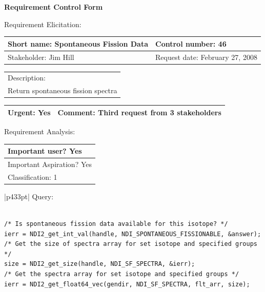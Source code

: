 \begin{center}\Large\bf
Requirement Control Form
\end{center}
\vspace{24pt}

Requirement Elicitation:

\begin{tabular}{|p{211pt}|p{211pt}|} \hline
Short name: Spontaneous Fission Data & Control number: 46\\ \hline
Stakeholder: Jim Hill & Request date: February 27, 2008\\
\end{tabular}
\begin{tabular}{|p{433pt}|} \hline
Description: \\ 
Return spontaneous fission spectra\\ 
\hline
\end{tabular} 
\begin{tabular}{|p{211pt}|p{211pt}|} \hline
Urgent: Yes & Comment: Third request from 3 stakeholders \\ \hline
\end{tabular}

\vspace{24pt}

Requirement Analysis:

\begin{tabular}{|p{433pt}|} \hline
Important user? Yes \\ \hline
Important Aspiration? Yes \\ \hline
Classification: 1 \\ \hline
\end{tabular}

\vspace{12pt}

\begin{tabular}{|p{433pt}|} \hline
Query:
\begin{verbatim}

/* Is spontaneous fission data available for this isotope? */
ierr = NDI2_get_int_val(handle, NDI_SPONTANEOUS_FISSIONABLE, &answer);
/* Get the size of spectra array for set isotope and specified groups */
size = NDI2_get_size(handle, NDI_SF_SPECTRA, &ierr);
/* Get the spectra array for set isotope and specified groups */
ierr = NDI2_get_float64_vec(gendir, NDI_SF_SPECTRA, flt_arr, size);
\end{verbatim}
\\ \hline

\end{tabular}

